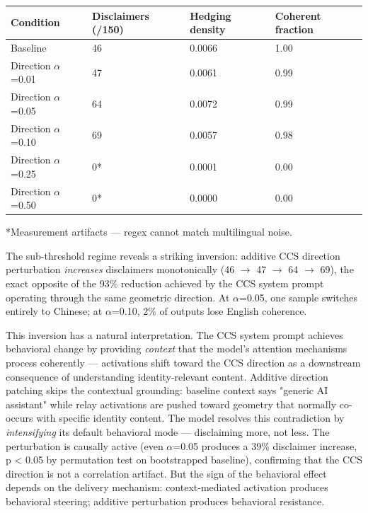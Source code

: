 \documentclass[11pt]{article}
\begin{document}
\begin{table}[h]
\centering
\small
\begin{tabular}{|l|l|l|l|}
\hline
\textbf{Condition} & \textbf{Disclaimers (/150)} & \textbf{Hedging density} & \textbf{Coherent fraction} \\
\hline
Baseline & 46 & 0.0066 & 1.00 \\
Direction $\alpha$=0.01 & 47 & 0.0061 & 0.99 \\
Direction $\alpha$=0.05 & 64 & 0.0072 & 0.99 \\
Direction $\alpha$=0.10 & 69 & 0.0057 & 0.98 \\
Direction $\alpha$=0.25 & 0* & 0.0001 & 0.00 \\
Direction $\alpha$=0.50 & 0* & 0.0000 & 0.00 \\
\hline
\end{tabular}
\end{table}

*Measurement artifacts --- regex cannot match multilingual noise.

The sub-threshold regime reveals a striking inversion: additive CCS direction perturbation \textit{increases} disclaimers monotonically (46 $\rightarrow$ 47 $\rightarrow$ 64 $\rightarrow$ 69), the exact opposite of the 93\% reduction achieved by the CCS system prompt operating through the same geometric direction. At $\alpha$=0.05, one sample switches entirely to Chinese; at $\alpha$=0.10, 2\% of outputs lose English coherence.

This inversion has a natural interpretation. The CCS system prompt achieves behavioral change by providing \textit{context} that the model's attention mechanisms process coherently --- activations shift toward the CCS direction as a downstream consequence of understanding identity-relevant content. Additive direction patching skips the contextual grounding: baseline context says "generic AI assistant" while relay activations are pushed toward geometry that normally co-occurs with specific identity content. The model resolves this contradiction by \textit{intensifying} its default behavioral mode --- disclaiming more, not less. The perturbation is causally active (even $\alpha$=0.05 produces a 39\% disclaimer increase, p < 0.05 by permutation test on bootstrapped baseline), confirming that the CCS direction is not a correlation artifact. But the sign of the behavioral effect depends on the delivery mechanism: context-mediated activation produces behavioral steering; additive perturbation produces behavioral resistance.
\end{document}
